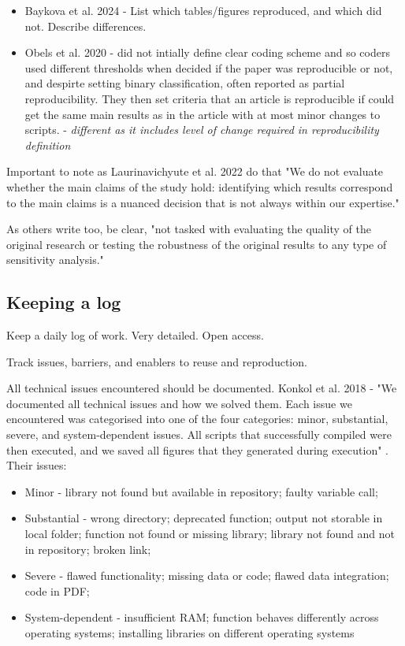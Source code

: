 \begin{itemize}
    \item Baykova et al. 2024 - List which tables/figures reproduced, and which did not. Describe differences.\autocite{baykova_ensuring_2024}
    \item Obels et al. 2020 - did not intially define clear coding scheme and so coders used different thresholds when decided if the paper was reproducible or not, and despirte setting binary classification, often reported as partial reproducibility. They then set criteria that an article is reproducible if could get the same main results as in the article with at most minor changes to scripts.\autocite{obels_analysis_2020} - \textit{different as it includes level of change required in reproducibility definition}
\end{itemize}

Important to note as Laurinavichyute et al. 2022 do that "We do not evaluate whether the main claims of the study hold: identifying which results correspond to the main claims is a nuanced decision that is not always within our expertise."

As others write too, be clear, "not tasked with evaluating the quality of the original research or testing the robustness of the original results to any type of sensitivity analysis."\autocite{wood_push_2018}

\subsection{Keeping a log}


Keep a daily log of work. Very detailed. Open access.

Track issues, barriers, and enablers to reuse and reproduction.

All technical issues encountered should be documented. Konkol et al. 2018 - "We documented all technical issues and how we solved them. Each issue we encountered was categorised into one of the four categories: minor, substantial, severe, and system-dependent issues. All scripts that successfully compiled were then executed, and we saved all figures that they generated during execution" . Their issues:
\begin{itemize}
    \item Minor - library not found but available in repository; faulty variable call;
    \item Substantial - wrong directory; deprecated function; output not storable in local folder; function not found or missing library; library not found and not in repository; broken link;
    \item Severe - flawed functionality; missing data or code; flawed data integration; code in PDF;
    \item System-dependent - insufficient RAM; function behaves differently across operating systems; installing libraries on different operating systems\autocite{konkol_computational_2019}
\end{itemize}

